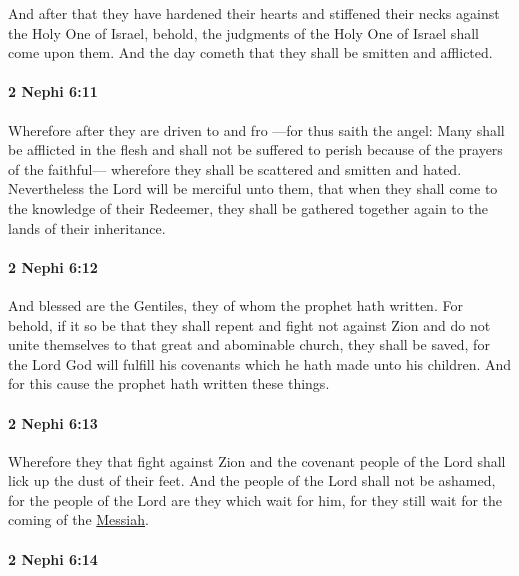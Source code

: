 			And after that they have hardened their hearts
			and stiffened their necks against the Holy One of Israel,
			behold, the judgments of the Holy One of Israel shall come upon them.
			And the day cometh that they shall be smitten and afflicted.

		\paragraph{2 Nephi 6:11} %
			\label{2NEPHI-6-11}

			Wherefore after they are driven to and fro
			---for thus saith the angel:
			Many shall be afflicted in the flesh
			and shall not be suffered to perish because of the prayers of the faithful---
			wherefore they shall be scattered and smitten and hated.
			Nevertheless the Lord will be merciful unto them,
			that when they shall come to the knowledge of their Redeemer,
			they shall be gathered together again to the lands of their inheritance.

		\paragraph{2 Nephi 6:12} %
			\label{2NEPHI-6-12}

			And blessed are the Gentiles,
			they of whom the prophet hath written.
			For behold, if it so be that they shall repent and fight not against Zion
			and do not unite themselves to that great and abominable church,
			they shall be saved,
			for the Lord God will fulfill his covenants
			which he hath made unto his children.
			And for this cause the prophet hath written these things.

		\paragraph{2 Nephi 6:13} %
			\label{2NEPHI-6-13}

			Wherefore they that fight against Zion and the covenant people of the Lord
			shall lick up the dust of their feet.
			And the people of the Lord shall not be ashamed,
			for the people of the Lord are they which wait for him,
			for they still wait for the coming of the \hyperref[MASHIACH]{Messiah}.

		\paragraph{2 Nephi 6:14} %
			\label{2NEPHI-6-14}

